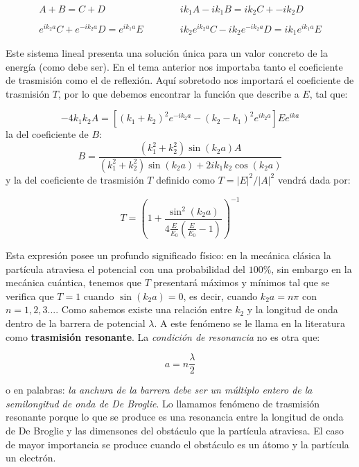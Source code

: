 \documentclass[12pt,a4paper]{article}
\numberwithin{equation}{section}
\numberwithin{figure}{section}
\newcommand{\parentesis}[1]{\left( #1  \right)}
\newcommand{\ccorchetes}[1]{\left[ #1  \right]}
\newcommand{\tquad}{\quad \quad \quad}
\begin{document}
\begin{equation}
\begin{array}{cc} 
A + B = C + D \tquad & ik_1 A - i k_1 B = i k_2 C + - i k_2 D \\ \\
e^{ik_2a}C + e^{-ik_2a}D = e^{ik_1a}E \tquad & ik_2 e^{ik_2a} C - i k_2 e^{-ik_2a} D = i k_1 e^{ik_1a} E
\end{array}
\end{equation}

Este sistema lineal presenta una solución única para un valor concreto de la energía (como debe ser). En el tema anterior nos importaba tanto el coeficiente de trasmisión como el de reflexión. Aquí sobretodo nos importará el coeficiente de trasmisión $T$, por lo que debemos encontrar la función que describe a $E$, tal que:

\begin{equation}
-4 k_1 k_2 A = \ccorchetes{(k_1+k_2)^2 e^{-i k_2 a} - (k_2 - k_1)^2 e^{ik_2 a}}E e^{ika}
\end{equation}
la del coeficiente de $B$:
\begin{equation}
B = \dfrac{(k_1^2 + k_2^2) \sin (k_2 a) A}{(k_1^2 + k_2^2) \sin (k_2 a) + 2 i k_1 k_2 \cos (k_2 a)}
\end{equation}
y la del coeficiente de trasmisión $T$ definido como $T=|E|^2 / |A|^2$ vendrá dada por:

\begin{equation}
T = \parentesis{1+ \dfrac{\sin^2 (k_2 a)}{4 \frac{E}{E_0} \parentesis{\frac{E}{E_0}-1}}}^{-1}
\end{equation}

Esta expresión posee un profundo significado físico: en la mecánica clásica la partícula atraviesa el potencial con una probabilidad del $100\%$, sin embargo en la mecánica cuántica, tenemos que $T$ presentará máximos y mínimos tal que se verifica que $T=1$ cuando $\sin(k_2a)=0$, es decir, cuando $k_2 a = n \pi$ con $n=1,2,3...$. Como sabemos existe una relación entre $k_2$ y la longitud de onda dentro de la barrera de potencial $\lambda$. A este fenómeno se le llama en la literatura como \textbf{trasmisión resonante}. La \textit{condición de resonancia} no es otra que:

\begin{equation}
a = n \dfrac{\lambda}{2}
\end{equation}

o en palabras: \textit{la anchura de la barrera debe ser un múltiplo entero de la semilongitud de onda de De Broglie}. Lo llamamos fenómeno de trasmisión resonante porque lo que se produce es una resonancia entre la longitud de onda de De Broglie y las dimensones del obstáculo que la partícula atraviesa. El caso de mayor importancia se produce cuando el obstáculo es un átomo y la partícula un electrón. \\
\end{document}

